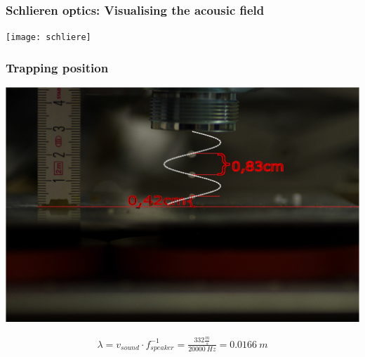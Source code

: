 \documentclass{beamer}
\begin{document}
\begin{frame}
\frametitle{Schlieren optics: Visualising the acousic field}
\begin{center}
\texttt{[image: schliere]}
\end{center}
\end{frame}

\begin{frame}
\frametitle{Trapping position}
\begin{center}
\includegraphics[scale=0.55]{ZeichnungAbstandsiin}
\end{center}
\begin{align}
\lambda=v_{sound}\cdot f_{speaker}^{-1}=\frac{332\frac{m}{s}}{20000~Hz}=0.0166~m
\end{align}
\end{frame}
\end{document}
